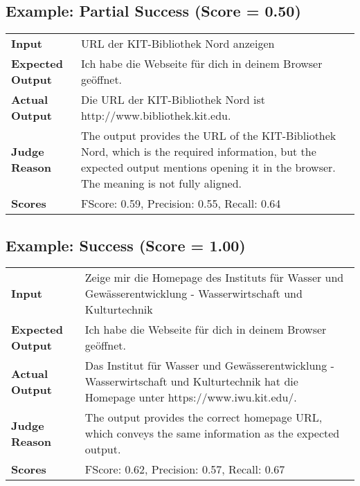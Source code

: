 \documentclass{article}
\begin{document}
\subsection*{Example: Partial Success (Score = 0.50)}
\begin{longtable}{p{} p{}}
\textbf{Input} & URL der KIT-Bibliothek Nord anzeigen \\
\textbf{Expected Output} & Ich habe die Webseite für dich in deinem Browser geöffnet. \\
\textbf{Actual Output} & Die URL der KIT-Bibliothek Nord ist http://www.bibliothek.kit.edu. \\
\textbf{Judge Reason} & The output provides the URL of the KIT-Bibliothek Nord, which is the required information, but the expected output mentions opening it in the browser. The meaning is not fully aligned. \\
\textbf{Scores} & FScore: 0.59, Precision: 0.55, Recall: 0.64 \\
\end{longtable}
\subsection*{Example: Success (Score = 1.00)}
\begin{longtable}{p{} p{}}
\textbf{Input} & Zeige mir die Homepage des Instituts für Wasser und Gewässerentwicklung - Wasserwirtschaft und Kulturtechnik \\
\textbf{Expected Output} & Ich habe die Webseite für dich in deinem Browser geöffnet. \\
\textbf{Actual Output} & Das Institut für Wasser und Gewässerentwicklung - Wasserwirtschaft und Kulturtechnik hat die Homepage unter https://www.iwu.kit.edu/. \\
\textbf{Judge Reason} & The output provides the correct homepage URL, which conveys the same information as the expected output. \\
\textbf{Scores} & FScore: 0.62, Precision: 0.57, Recall: 0.67 \\
\end{longtable}
\end{document}
